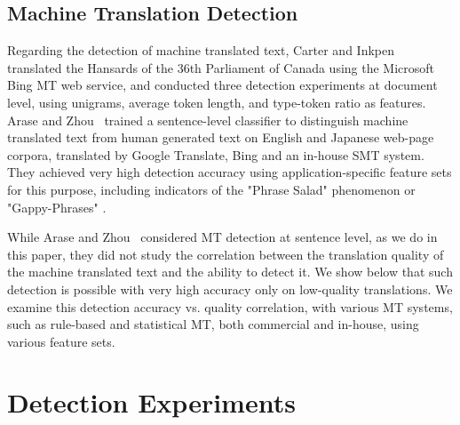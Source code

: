 \documentclass[11pt]{article}
\begin{document}
\subsection{Machine Translation Detection}
Regarding the detection of machine translated text, Carter and Inkpen~ translated the Hansards of the 36th Parliament of Canada using the Microsoft Bing MT web service, and conducted three detection experiments at document level, using unigrams, average token length, and type-token ratio as features. Arase and Zhou~ trained a sentence-level classifier to distinguish machine translated text from human generated text on English and Japanese web-page corpora, translated by Google Translate, Bing and an in-house SMT system. They achieved very high detection accuracy using application-specific feature sets for this purpose, including indicators of the "Phrase Salad" \cite{lopez2008statistical} phenomenon or "Gappy-Phrases" \cite{conf/acl/BansalQM11}.

While Arase and Zhou~ considered MT detection at sentence level, as we do in this paper, they did not study the correlation between the translation quality of the machine translated text and the ability to detect it. We show below that such detection is possible with very high accuracy only on low-quality translations. We examine this detection accuracy vs. quality correlation, with various MT systems, such as rule-based and statistical MT, both commercial and in-house, using various feature sets. 


\section{Detection Experiments}
\end{document}
